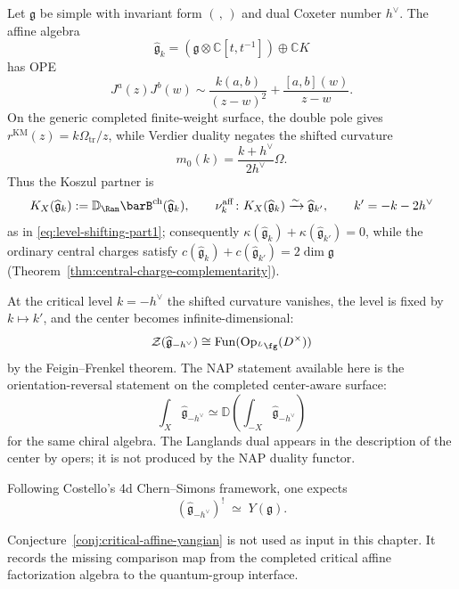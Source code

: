\begin{example}\label{ex:kac-moody-NAP}
Let $\mathfrak{g}$ be simple with invariant form $(\, ,\,)$ and
dual Coxeter number $h^\vee$. The affine algebra
\[
\widehat{\mathfrak{g}}_k
=
(\mathfrak{g}\otimes\mathbb{C}[t,t^{-1}])\oplus\mathbb{C}K
\]
has OPE
\[
J^a(z)J^b(w)
\sim
\frac{k(a,b)}{(z-w)^2}
+\frac{[a,b](w)}{z-w}.
\]
On the generic completed finite-weight surface, the double pole gives
$r^{\mathrm{KM}}(z)=k\Omega_{\mathrm{tr}}/z$, while Verdier duality negates the
shifted curvature
\[
m_0(k)=\frac{k+h^\vee}{2h^\vee}\Omega .
\]
Thus the Koszul partner is
\[
K_X(\widehat{\mathfrak g}_k):=
\mathbb{D}_{\Ran}\barB^{\mathrm{ch}}(\widehat{\mathfrak{g}}_k),
\qquad
\nu_k^{\mathrm{aff}}\colon
K_X(\widehat{\mathfrak g}_k)\xrightarrow{\sim}
\widehat{\mathfrak{g}}_{k'},
\qquad
k'=-k-2h^\vee
\]
as in \eqref{eq:level-shifting-part1}; consequently
$\kappa(\widehat{\mathfrak g}_k)+
\kappa(\widehat{\mathfrak g}_{k'})=0$, while the ordinary central
charges satisfy
$c(\widehat{\mathfrak g}_k)+c(\widehat{\mathfrak g}_{k'})
=2\dim\mathfrak g$
\textup{(}Theorem~\ref{thm:central-charge-complementarity}\textup{)}.

At the critical level $k=-h^\vee$ the shifted curvature vanishes, the
level is fixed by $k\mapsto k'$, and the center becomes
infinite-dimensional:
\[
\mathcal{Z}(\widehat{\mathfrak{g}}_{-h^\vee})
\cong
\operatorname{Fun}(\operatorname{Op}_{{}^L\fg}(D^\times))
\]
by the Feigin--Frenkel theorem. The NAP statement available here is
the orientation-reversal statement on the completed center-aware
surface:
\[
\int_X \widehat{\mathfrak{g}}_{-h^\vee}
\simeq
\mathbb{D}\!\left(\int_{-X}\widehat{\mathfrak{g}}_{-h^\vee}\right)
\]
for the same chiral algebra. The Langlands dual appears in the
description of the center by opers; it is not produced by the NAP
duality functor.

\begin{conjecture}\label{conj:critical-affine-yangian}
Following Costello's 4d Chern--Simons framework, one expects
\[
(\widehat{\mathfrak{g}}_{-h^\vee})^! \;\simeq\; Y(\mathfrak{g}).
\]
\end{conjecture}

\begin{remark}
Conjecture~\ref{conj:critical-affine-yangian} is not used as input in
this chapter. It records the missing comparison map from the completed
critical affine factorization algebra to the quantum-group interface.
\end{remark}
\end{example}

